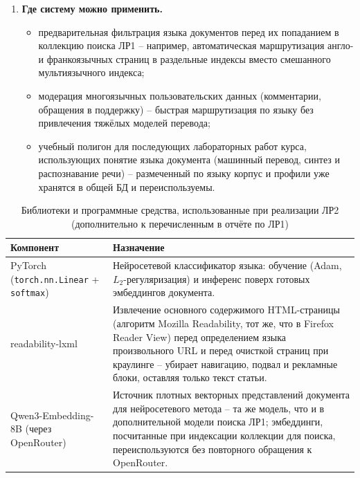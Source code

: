 \begin{enumerate}
\begin{itemize}
    разбиениям вместо одного фиксированного train/test -- сейчас 100\,\%
    точность алфавитного и нейросетевого методов может быть отчасти
    объяснена удачным разбиением, а не только качеством методов.
  \end{itemize}
  \item \textbf{Где систему можно применить.}
  \begin{itemize}
    \item предварительная фильтрация языка документов перед их
    попаданием в коллекцию поиска ЛР1 -- например, автоматическая
    маршрутизация англо- и франкоязычных страниц в раздельные индексы
    вместо смешанного мультиязычного индекса;
    \item модерация многоязычных пользовательских данных (комментарии,
    обращения в поддержку) -- быстрая маршрутизация по языку без
    привлечения тяжёлых моделей перевода;
    \item учебный полигон для последующих лабораторных работ курса,
    использующих понятие языка документа (машинный перевод, синтез и
    распознавание речи) -- размеченный по языку корпус и профили уже
    хранятся в общей БД и переиспользуемы.
  \end{itemize}
\end{enumerate}


\begin{table}[H]
  \centering
  \caption{Библиотеки и программные средства, использованные при реализации ЛР2 (дополнительно к перечисленным в отчёте по ЛР1)}
  \label{tab:stack-langid}
  \small
  \begin{tabularx}{\textwidth}{|l|X|}
    \hline
    Компонент & Назначение \\
    \hline
    PyTorch (\texttt{torch.nn.Linear} + \texttt{softmax}) & Нейросетевой
      классификатор языка: обучение (Adam, $L_2$-регуляризация) и
      инференс поверх готовых эмбеддингов документа. \\
    \hline
    readability-lxml & Извлечение основного содержимого HTML-страницы
      (алгоритм Mozilla Readability, тот же, что в Firefox Reader View)
      перед определением языка произвольного URL и перед очисткой
      страниц при краулинге -- убирает навигацию, подвал и рекламные
      блоки, оставляя только текст статьи. \\
    \hline
    Qwen3-Embedding-8B (через OpenRouter) & Источник плотных векторных
      представлений документа для нейросетевого метода -- та же модель,
      что и в дополнительной модели поиска ЛР1; эмбеддинги, посчитанные
      при индексации коллекции для поиска, переиспользуются без
      повторного обращения к OpenRouter. \\
    \hline
  \end{tabularx}
\end{table}
